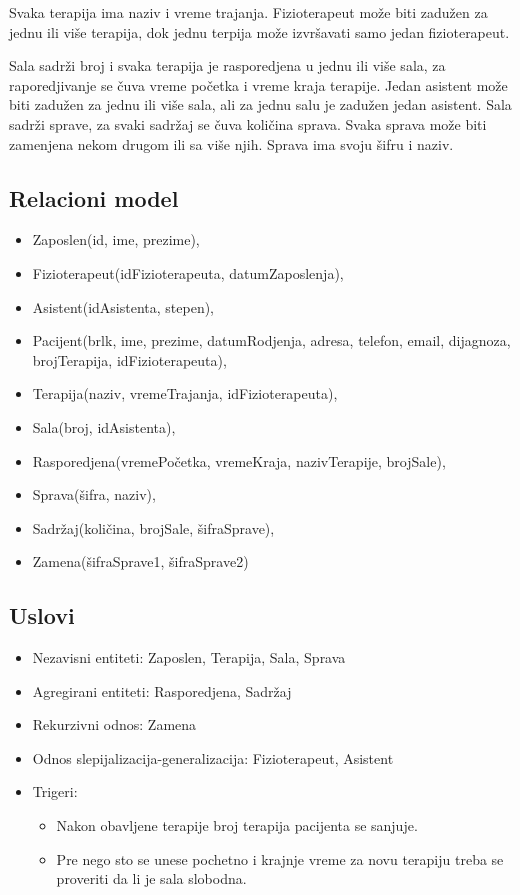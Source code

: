 \documentclass{article}
\begin{document}
Svaka terapija ima naziv i vreme trajanja. Fizioterapeut može biti zadužen za jednu ili više terapija, dok jednu terpija može izvršavati samo jedan fizioterapeut.

Sala sadrži broj i svaka terapija je rasporedjena u jednu ili više sala, za raporedjivanje se čuva vreme početka i vreme kraja terapije. Jedan asistent može biti zadužen za jednu ili više sala, ali za jednu salu je zadužen jedan asistent. Sala sadrži sprave, za svaki sadržaj se čuva količina sprava. Svaka sprava može biti zamenjena nekom drugom ili sa više njih. Sprava ima svoju šifru i naziv.

\subsection{Relacioni model}
\begin{itemize} 
	\item Zaposlen(id, ime, prezime),
	\item Fizioterapeut(idFizioterapeuta, datumZaposlenja),
	\item Asistent(idAsistenta, stepen),
	\item Pacijent(brlk, ime, prezime, datumRodjenja, adresa, telefon, email, dijagnoza, brojTerapija, idFizioterapeuta),
	\item Terapija(naziv, vremeTrajanja, idFizioterapeuta),
	\item Sala(broj, idAsistenta),
	\item Rasporedjena(vremePočetka, vremeKraja, nazivTerapije, brojSale),
	\item Sprava(šifra, naziv),
	\item Sadržaj(količina, brojSale, šifraSprave),
	\item Zamena(šifraSprave1, šifraSprave2)
\end{itemize}

\subsection{Uslovi}
\begin{itemize}
	\item Nezavisni entiteti: Zaposlen, Terapija, Sala, Sprava
	\item Agregirani entiteti: Rasporedjena, Sadržaj
	\item Rekurzivni odnos: Zamena
	\item Odnos slepijalizacija-generalizacija: Fizioterapeut, Asistent
	\item Trigeri: 
		\begin{itemize}
			\item Nakon obavljene terapije broj terapija pacijenta se sanjuje.
			\item Pre nego sto se unese pochetno i krajnje vreme za novu terapiju treba se proveriti da li je sala slobodna.
		\end{itemize}	
\end{itemize}
\end{document}
